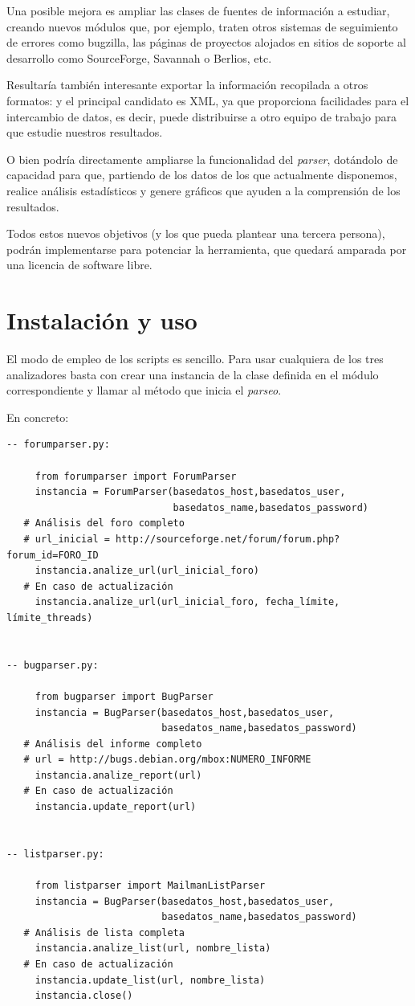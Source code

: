 Una posible mejora es ampliar las clases de fuentes de información a estudiar,
creando nuevos módulos que, por ejemplo, traten otros sistemas de seguimiento
de errores como bugzilla, las páginas de proyectos alojados en sitios de
soporte al desarrollo como SourceForge, Savannah o Berlios, etc.

Resultaría también interesante exportar la información recopilada a otros formatos:
y el principal candidato es XML, ya que proporciona facilidades para el intercambio
de datos, es decir, puede distribuirse a otro equipo de trabajo para que estudie
nuestros resultados.

O bien podría directamente ampliarse la funcionalidad del
\textit{parser}, dotándolo de capacidad para que, partiendo de los datos de los
que actualmente disponemos, realice análisis estadísticos y genere gráficos
que ayuden a la comprensión de los resultados.

Todos estos nuevos objetivos (y los que pueda plantear una tercera persona),
podrán implementarse para potenciar la herramienta, que quedará amparada por
una licencia de software libre.




\cleardoublepage

\appendix
\chapter{Instalación y uso}
El modo de empleo de los scripts es sencillo. Para usar cualquiera de
los tres analizadores basta con crear una instancia de la clase definida
en el módulo correspondiente y llamar al método que inicia el \textit{parseo}.

En concreto:

{\footnotesize
\begin{verbatim}
-- forumparser.py:

     from forumparser import ForumParser
     instancia = ForumParser(basedatos_host,basedatos_user,
                             basedatos_name,basedatos_password)
   # Análisis del foro completo
   # url_inicial = http://sourceforge.net/forum/forum.php?forum_id=FORO_ID
     instancia.analize_url(url_inicial_foro)
   # En caso de actualización
     instancia.analize_url(url_inicial_foro, fecha_límite, límite_threads)


-- bugparser.py:

     from bugparser import BugParser
     instancia = BugParser(basedatos_host,basedatos_user,
                           basedatos_name,basedatos_password)
   # Análisis del informe completo
   # url = http://bugs.debian.org/mbox:NUMERO_INFORME
     instancia.analize_report(url)
   # En caso de actualización
     instancia.update_report(url)


-- listparser.py:

     from listparser import MailmanListParser
     instancia = BugParser(basedatos_host,basedatos_user,
                           basedatos_name,basedatos_password)
   # Análisis de lista completa
     instancia.analize_list(url, nombre_lista)
   # En caso de actualización
     instancia.update_list(url, nombre_lista)
     instancia.close()
\end{verbatim}
}

